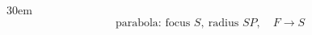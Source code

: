 \documentclass[border=4pt]{standalone}
\begin{document}
\begin{varwidth}{30em}
\large
\[ \text{parabola: focus } S,\ \text{radius } SP,\quad F \to S \]

\end{varwidth}
\end{document}
